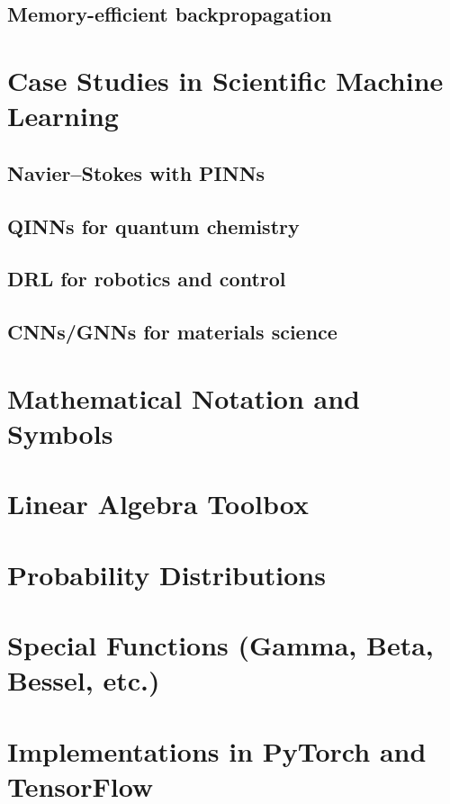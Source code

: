 \section{Memory-efficient backpropagation}

\chapter{Case Studies in Scientific Machine Learning}
\section{Navier–Stokes with PINNs}
\section{QINNs for quantum chemistry}
\section{DRL for robotics and control}
\section{CNNs/GNNs for materials science}

\appendix
\chapter{Mathematical Notation and Symbols}
\chapter{Linear Algebra Toolbox}
\chapter{Probability Distributions}
\chapter{Special Functions (Gamma, Beta, Bessel, etc.)}
\chapter{Implementations in PyTorch and TensorFlow}

\backmatter

